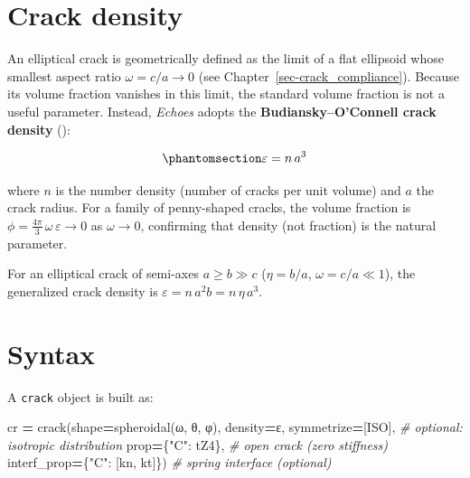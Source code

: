 \documentclass[
  a4paper,
  numbers=noendperiod,
  DIV=12]{scrreprt}
\newenvironment{Shaded}{\begin{snugshade}}{\end{snugshade}}
\newcommand{\CommentTok}[1]{\textcolor[rgb]{0.56,0.35,0.01}{\textit{#1}}}
\newcommand{\NormalTok}[1]{#1}
\newcommand{\OperatorTok}[1]{\textcolor[rgb]{0.81,0.36,0.00}{\textbf{#1}}}
\newcommand{\StringTok}[1]{\textcolor[rgb]{0.31,0.60,0.02}{#1}}
\begin{document}
\section{Crack density}\label{crack-density}

An elliptical crack is geometrically defined as the limit of a flat
ellipsoid whose smallest aspect ratio \(\omega = c/a \to 0\) (see
Chapter~\ref{sec-crack_compliance}). Because its volume fraction
vanishes in this limit, the standard volume fraction is not a useful
parameter. Instead, \emph{Echoes} adopts the
\textbf{Budiansky--O'Connell crack density}
():

\begin{equation}\protect\phantomsection\label{eq-crack-density}{
\varepsilon = n\,a^3
}\end{equation}

where \(n\) is the number density (number of cracks per unit volume) and
\(a\) the crack radius. For a family of penny-shaped cracks, the volume
fraction is \(\phi = \tfrac{4\pi}{3}\,\omega\,\varepsilon \to 0\) as
\(\omega \to 0\), confirming that density (not fraction) is the natural
parameter.

For an elliptical crack of semi-axes \(a \geq b \gg c\) (\(\eta = b/a\),
\(\omega = c/a \ll 1\)), the generalized crack density is
\(\varepsilon = n\,a^2 b = n\,\eta\,a^3\).

\section{Syntax}\label{syntax}

A \texttt{crack} object is built as:

\begin{Shaded}
\begin{Highlighting}[]
\NormalTok{cr }\OperatorTok{=}\NormalTok{ crack(shape}\OperatorTok{=}\NormalTok{spheroidal(ω, θ, φ),}
\NormalTok{           density}\OperatorTok{=}\NormalTok{ε,}
\NormalTok{           symmetrize}\OperatorTok{=}\NormalTok{[ISO],        }\CommentTok{\# optional: isotropic distribution}
\NormalTok{           prop}\OperatorTok{=}\NormalTok{\{}\StringTok{"C"}\NormalTok{: tZ4\},         }\CommentTok{\# open crack (zero stiffness)}
\NormalTok{           interf\_prop}\OperatorTok{=}\NormalTok{\{}\StringTok{"C"}\NormalTok{: [kn, kt]\})  }\CommentTok{\# spring interface (optional)}
\end{Highlighting}
\end{Shaded}
\end{document}
